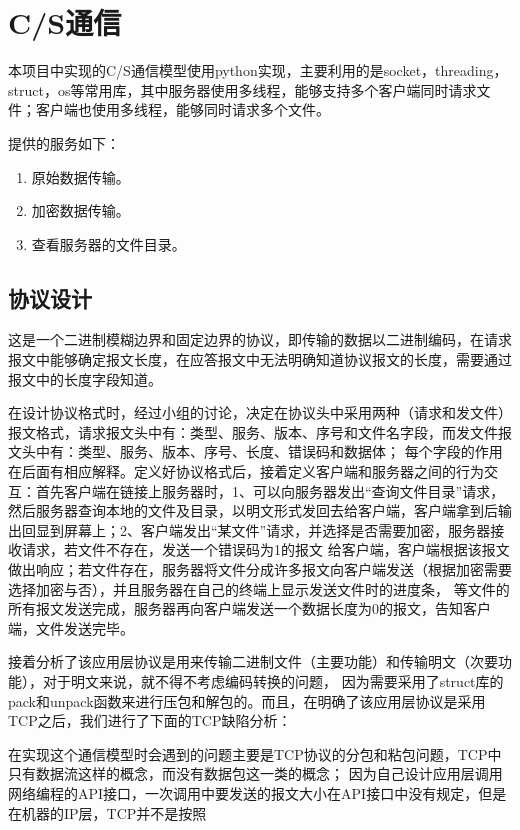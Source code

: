 \documentclass[15pt]{ctexart}
\begin{document}
\section{C/S通信} %
\label{sec:c_s通信}
\par 本项目中实现的C/S通信模型使用python实现，主要利用的是socket，threading，struct，os等常用库，其中服务器使用多线程，能够支持多个客户端同时请求文件；客户端也使用多线程，能够同时请求多个文件。
\par 提供的服务如下：
\begin{enumerate}[1.]
	\item 原始数据传输。
	\item 加密数据传输。
	\item 查看服务器的文件目录。
\end{enumerate}
\subsection{协议设计} %
\label{sub:协议设计}
\par 这是一个二进制模糊边界和固定边界的协议，即传输的数据以二进制编码，在请求报文中能够确定报文长度，在应答报文中无法明确知道协议报文的长度，需要通过报文中的长度字段知道。
\par 在设计协议格式时，经过小组的讨论，决定在协议头中采用两种（请求和发文件）报文格式，请求报文头中有：类型、服务、版本、序号和文件名字段，而发文件报文头中有：类型、服务、版本、序号、长度、错误码和数据体；
每个字段的作用在后面有相应解释。定义好协议格式后，接着定义客户端和服务器之间的行为交互：首先客户端在链接上服务器时，1、可以向服务器发出“查询文件目录”请求，
然后服务器查询本地的文件及目录，以明文形式发回去给客户端，客户端拿到后输出回显到屏幕上；2、客户端发出“某文件”请求，并选择是否需要加密，服务器接收请求，若文件不存在，发送一个错误码为1的报文
给客户端，客户端根据该报文做出响应；若文件存在，服务器将文件分成许多报文向客户端发送（根据加密需要选择加密与否），并且服务器在自己的终端上显示发送文件时的进度条，
等文件的所有报文发送完成，服务器再向客户端发送一个数据长度为0的报文，告知客户端，文件发送完毕。
\par 接着分析了该应用层协议是用来传输二进制文件（主要功能）和传输明文（次要功能），对于明文来说，就不得不考虑编码转换的问题，
因为需要采用了struct库的pack和unpack函数来进行压包和解包的。而且，在明确了该应用层协议是采用TCP之后，我们进行了下面的TCP缺陷分析：
\par 在实现这个通信模型时会遇到的问题主要是TCP协议的分包和粘包问题，TCP中只有数据流这样的概念，而没有数据包这一类的概念；
因为自己设计应用层调用网络编程的API接口，一次调用中要发送的报文大小在API接口中没有规定，但是在机器的IP层，TCP并不是按照
\end{document}
